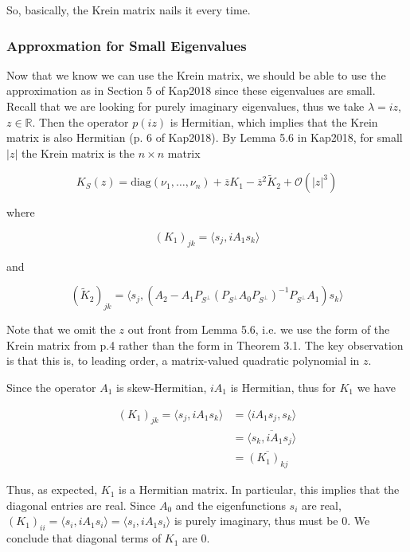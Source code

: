 \documentclass[12pt]{article}
\def\R{{\mathbb R}}
\begin{document}
So, basically, the Krein matrix nails it every time.\\

\subsubsection{Approxmation for Small Eigenvalues}

Now that we know we can use the Krein matrix, we should be able to use the approximation as in Section 5 of Kap2018 since these eigenvalues are small.\\

Recall that we are looking for purely imaginary eigenvalues, thus we take $\lambda = i z$, $z \in \R$. Then the operator $p(iz)$ is Hermitian, which implies that the Krein matrix is also Hermitian (p. 6 of Kap2018). By Lemma 5.6 in Kap2018, for small $|z|$ the Krein matrix is the $n \times n$ matrix

\begin{equation}
K_S(z) = \text{diag}(\nu_1, \dots, \nu_n) + \overline{z} K_1 - \overline{z}^2 \tilde{K}_2 + \mathcal{O}(|z|^3)
\end{equation}

where

\begin{equation}
(K_1)_{jk} = \langle s_j, i A_1 s_k \rangle
\end{equation}

and

\begin{equation}
(\tilde{K}_2)_{jk} = \langle s_j, (A_2 - A_1 P_{S^\perp} (P_{S^\perp} A_0 P_{S^\perp})^{-1} P_{S^\perp} A_1 ) s_k  \rangle
\end{equation}

Note that we omit the $z$ out front from Lemma 5.6, i.e. we use the form of the Krein matrix from p.4 rather than the form in Theorem 3.1. The key observation is that this is, to leading order, a matrix-valued quadratic polynomial in $z$.

Since the operator $A_1$ is skew-Hermitian, $i A_1$ is Hermitian, thus for $K_1$ we have

\begin{align*}
(K_1)_{jk} = \langle s_j, i A_1 s_k \rangle &= \langle i A_1 s_j, s_k \rangle \\
&= \overline{ \langle s_k, i A_1 s_j \rangle } \\
&= \overline{ (K_1)_{kj} }
\end{align*}

Thus, as expected, $K_1$ is a Hermitian matrix. In particular, this implies that the diagonal entries are real. Since $A_0$ and the eigenfunctions $s_i$ are real, $(K_1)_{ii} = \langle s_i, i A_1 s_i \rangle = \langle s_i, i A_1 s_i \rangle$ is purely imaginary, thus must be 0. We conclude that diagonal terms of $K_1$ are 0.\\
\end{document}
